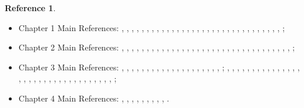 \documentclass[12pt]{book}
\theoremstyle{definition}
\newtheorem{reference}{Reference}
\begin{document}
\begin{reference}\mbox{}
\begin{itemize}
\item[$\square$] Chapter 1 Main References: \cite{Sch1}, \cite{KL1}, \cite{KL2}, \cite{BL1}, \cite{BL2}, \cite{BS}, \cite{BHS}, \cite{Fon1}, \cite{CS1}, \cite{CS2}, \cite{BK}, \cite{BBK}, \cite{BBBK}, \cite{KKM}, \cite{KM}, \cite{LZ}, \cite{TT}, \cite{B}, \cite{Shi}, \cite{AI1}, \cite{AI2}, \cite{AI3}, \cite{AB1}, \cite{AB2}, \cite{Fon2}, \cite{Fon3}, \cite{Fa1}, \cite{M}, \cite{Fa2}, \cite{Fa3}, \cite{Fon4}, \cite{Fon5}, \cite{Fon6}; 
\item[$\square$] Chapter 2 Main References: \cite{Sch1}, \cite{Sch2}, \cite{FS}, \cite{KL1}, \cite{KL2}, \cite{BL1}, \cite{BL2}, \cite{BS}, \cite{BHS}, \cite{Fon1}, \cite{CS1}, \cite{CS2}, \cite{BK}, \cite{BBK}, \cite{BBBK}, \cite{KKM}, \cite{KM}, \cite{LZ}, \cite{TT}, \cite{B}, \cite{Shi}, \cite{AI1}, \cite{AI2}, \cite{AI3}, \cite{AB1}, \cite{AB2}, \cite{Fon2}, \cite{Fon3}, \cite{Fa1}, \cite{M}, \cite{Fa2}, \cite{Fa3}, \cite{Fon4}, \cite{Fon5}, \cite{Fon6};
\item[$\square$] Chapter 3 Main References: \cite{Sch1}, \cite{Sch2}, \cite{FS}, \cite{FF}, \cite{KL1}, \cite{KL2}, \cite{BL1}, \cite{BL2}, \cite{BS}, \cite{BHS}, \cite{Fon1}, \cite{CS1}, \cite{CS2}, \cite{BK}, \cite{BBK}, \cite{BBBK}, \cite{KKM}, \cite{KM}, \cite{LBV}, \cite{B}, \cite{SW}; \cite{Sch1}, \cite{Sch2}, \cite{FS}, \cite{KL1}, \cite{KL2}, \cite{BL1}, \cite{BL2}, \cite{BS}, \cite{BHS}, \cite{Fon1}, \cite{CS1}, \cite{CS2}, \cite{BK}, \cite{BBK}, \cite{BBBK}, \cite{KKM}, \cite{KM}, \cite{LZ}, \cite{TT}, \cite{B}, \cite{Shi}, \cite{AI1}, \cite{AI2}, \cite{AI3}, \cite{AB1}, \cite{AB2}, \cite{Fon2}, \cite{Fon3}, \cite{Fa1}, \cite{M}, \cite{Fa2}, \cite{Fa3}, \cite{Fon4}, \cite{Fon5}, \cite{Fon6};
\item[$\square$] Chapter 4 Main References: \cite{FS}, \cite{FF}, \cite{Sch1}, \cite{Sch2}, \cite{KL1}, \cite{KL2}, \cite{LBV}, \cite{B}, \cite{SW}, \cite{BS}.
\end{itemize}
\end{reference}


\newpage
\end{document}
